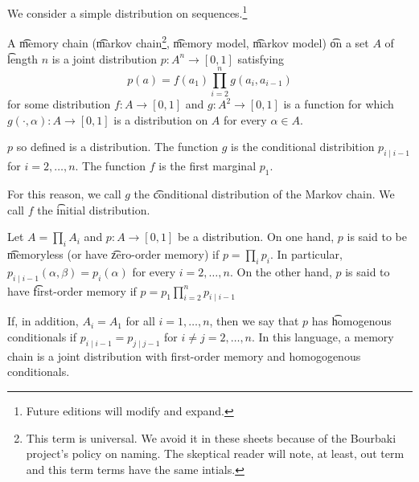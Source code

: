 


We consider a simple distribution on sequences.\footnote{Future editions will modify and expand.}


A \t{memory chain} (\t{markov chain}\footnote{This term is universal. We avoid it in these sheets because of the Bourbaki project's policy on naming. The skeptical reader will note, at least, out term and this term terms have the same intials.}, \t{memory model}, \t{markov model}) \t{on} a set $A$ of \t{length} $n$ is a joint distribution $p: A^n \to [0, 1]$ satisfying
\[
    p(a) = f(a_1)\prod_{i = 2}^{n} g(a_i, a_{i-1})
\]
for some distribution $f: A \to [0, 1]$ and $g: A^2 \to [0, 1]$ is a function for which $g(\cdot, \alpha): A \to [0, 1]$ is a distribution on $A$ for every $\alpha \in A$.

\begin{proposition}
  $p$ so defined is a distribution.
  The function $g$ is the conditional distribition $p_{i \mid i-1}$ for $i =2, \dots, n$.
  The function $f$ is the first marginal $p_1$.
\end{proposition}

For this reason, we call $g$ the \t{conditional distribution} of the Markov chain.
We call $f$ the \t{initial distribution}.


Let $A = \prod_{i} A_i$ and $p: A \to [0, 1]$ be a distribution.
On one hand, $p$ is said to be \t{memoryless} (or have \t{zero-order memory}) if $p = \prod_i p_i$.
In particular, $p_{i \mid i-1}(\alpha, \beta) = p_{i}(\alpha)$ for every $i = 2, \dots, n$.
On the other hand, $p$ is said to have \t{first-order memory} if $p = p_1 \prod_{i = 2}^n p_{i \mid i-1}$

If, in addition, $A_i = A_1$ for all $i = 1, \dots, n$, then we say that $p$ has \t{homogenous conditionals} if $p_{i \mid i-1} = p_{j \mid j-1}$ for $i \neq j = 2, \dots, n$.
In this language, a memory chain is a joint distribution with first-order memory and homogogenous conditionals.

\blankpage

